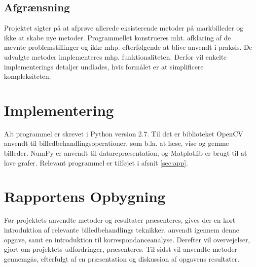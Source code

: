 \subsection{Afgrænsning} \label{subsec:afg}
Projektet sigter på at afprøve allerede eksisterende metoder på markbilleder og ikke at skabe nye metoder. Programmellet konstrueres mht. afklaring af de nævnte problemstillinger
og ikke mhp. efterfølgende at blive anvendt i praksis. De udvalgte metoder implementeres mhp. funktionaliteten. Derfor vil enkelte implementerings detaljer undlades, hvis formålet er at simplificere kompleksiteten.
\section{Implementering}
Alt programmel er skrevet i Python version 2.7. Til det er biblioteket OpenCV anvendt til billedbehandlingsoperationer, som b.la. at læse, vise og gemme billeder. NumPy er anvendt til datarepræsentation, og Matplotlib er brugt til at lave grafer. Relevant programmel er tilføjet i afsnit \ref{sec:app}.
\section{Rapportens Opbygning}
Før projektets anvendte metoder og resultater præsenteres, gives der en kort introduktion af relevante billedbehandlings teknikker, anvendt igennem denne opgave, samt en introduktion til  korrespondanceanalyse. Derefter vil overvejelser, gjort om projektets udfordringer, præsenteres. Til sidst vil anvendte metoder gennemgås, efterfulgt af en præsentation og diskussion af opgavens resultater.
